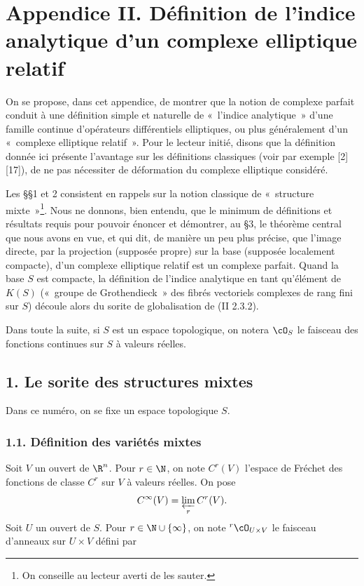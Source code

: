 \section*{Appendice II. Définition de l'indice analytique d'un complexe elliptique relatif}

On se propose, dans cet appendice, de montrer que la notion de complexe parfait conduit à une définition simple et naturelle de «~l'indice analytique~» d'une famille continue d'opérateurs différentiels elliptiques, ou plus généralement d'un «~complexe elliptique relatif~». Pour le lecteur initié, disons que la définition donnée ici présente l'avantage sur les définitions classiques (voir par exemple [2][17]), de ne pas nécessiter de déformation du complexe elliptique considéré.

Les §§1 et 2 consistent en rappels sur la notion classique de «~structure mixte~»\footnote{On conseille au lecteur averti de les sauter.}. Nous ne donnons, bien entendu, que le minimum de définitions et résultats requis pour pouvoir énoncer et démontrer, au §3, le théorème central que nous avons en vue, et qui dit, de manière un peu plus précise, que l'image directe, par la projection (supposée propre) sur la base (supposée localement compacte), d'un complexe elliptique relatif est un complexe parfait. Quand la base $S$ est compacte, la définition de l'indice analytique en tant qu'élément de $K(S)$ («~groupe de Grothendieck~» des fibrés vectoriels complexes de rang fini sur $S$) découle alors du sorite de globalisation de (II 2.3.2).

Dans toute la suite, si $S$ est un espace topologique, on notera $\cO_S$ le faisceau des fonctions continues sur $S$ à valeurs réelles.

\subsection*{1. Le sorite des structures mixtes}

Dans ce numéro, on se fixe un espace topologique $S$.

\subsubsection*{1.1. Définition des variétés mixtes}
Soit $V$ un ouvert de $\R^n$. Pour $r\in\N$, on note $C^r(V)$ l'espace de Fréchet des fonctions de classe $C^r$ sur $V$ à valeurs réelles. On pose
\[
  C^\infty(V)=\varprojlim_r C^r(V).
\]
Soit $U$ un ouvert de $S$. Pour $r\in\N\cup\{\infty\}$, on note ${}^r\cO_{U\times V}$ le faisceau d'anneaux sur $U\times V$ défini par
